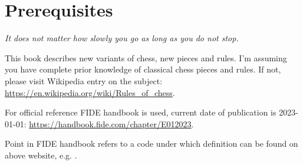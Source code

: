 

\chapter*{Prerequisites}
\label{ch:Prerequisites}

\begin{flushright}
\parbox{0.7\textwidth}{
\emph{It does not matter how slowly you go as long as you do not stop. \newline
{} } }
\end{flushright}

\noindent
This book describes new variants of chess, new pieces and rules. I'm assuming you
have complete prior knowledge of classical chess pieces and rules. If not, please
visit Wikipedia entry on the subject: \newline
\href{https://en.wikipedia.org/wiki/Rules\_of\_chess}{https://en.wikipedia.org/wiki/Rules\_of\_chess}.

For official reference FIDE handbook is used, current date of publication is 2023-01-01: \newline
\href{https://handbook.fide.com/chapter/E012023}{https://handbook.fide.com/chapter/E012023}.

Point in FIDE handbook refers to a code under which definition can be found on above website,
e.g. .

\clearpage %
